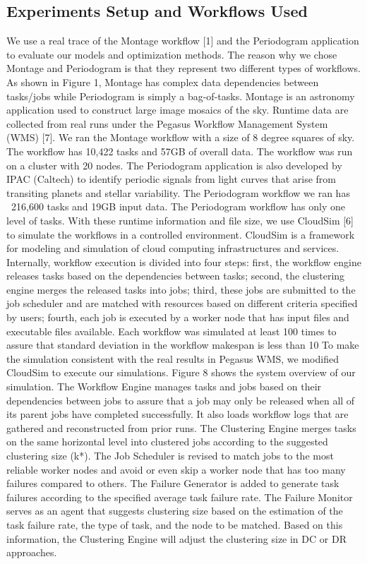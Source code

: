 \documentclass{IOS-Book-Article}
\begin{document}
\subsection{Experiments Setup and Workflows Used}
We use a real trace of the Montage workflow [1] and the Periodogram application to evaluate our models and optimization methods. The reason why we chose Montage and Periodogram is that they represent two different types of workflows. As shown in Figure 1, Montage has complex data dependencies between tasks/jobs while Periodogram is simply a bag-of-tasks. Montage is an astronomy application used to construct large image mosaics of the sky.  Runtime data are collected from real runs under the Pegasus Workflow Management System (WMS) [7]. We ran the Montage workflow with a size of 8 degree squares of sky. The workflow has 10,422 tasks and 57GB of overall data. The workflow was run on a cluster with 20 nodes. The Periodogram application is also developed by IPAC (Caltech) to identify periodic signals from light curves that arise from transiting planets and stellar variability. The Periodogram workflow we ran has ~216,600 tasks and 19GB input data. The Periodogram workflow has only one level of tasks. 
With these runtime information and file size, we use CloudSim [6] to simulate the workflows in a controlled environment.  CloudSim is a framework for modeling and simulation of cloud computing infrastructures and services. Internally, workflow execution is divided into four steps: first, the workflow engine releases tasks based on the dependencies between tasks; second, the clustering engine merges the released tasks into jobs; third, these jobs are submitted to the job scheduler and are matched with resources based on different criteria specified by users; fourth, each job is executed by a worker node that has input files and executable files available. Each workflow was simulated at least 100 times to assure that standard deviation in the workflow makespan is less than 10%
To make the simulation consistent with the real results in Pegasus WMS, we modified CloudSim to execute our simulations.  Figure 8 shows the system overview of our simulation. The Workflow Engine manages tasks and jobs based on their dependencies between jobs to assure that a job may only be released when all of its parent jobs have completed successfully. It also loads workflow logs that are gathered and reconstructed from prior runs. The Clustering Engine merges tasks on the same horizontal level into clustered jobs according to the suggested clustering size (k*). The Job Scheduler is revised to match jobs to the most reliable worker nodes and avoid or even skip a worker node that has too many failures compared to others. The Failure Generator is added to generate task failures according to the specified average task failure rate. The Failure Monitor serves as an agent that suggests clustering size based on the estimation of the task failure rate, the type of task, and the node to be matched. Based on this information, the Clustering Engine will adjust the clustering size in DC or DR approaches.
 
\end{document}
